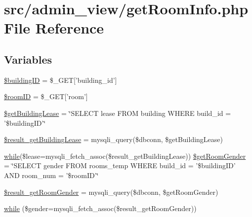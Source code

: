 \hypertarget{getRoomInfo_8php}{\section{src/admin\-\_\-view/get\-Room\-Info.php \-File \-Reference}
\label{getRoomInfo_8php}
}
\subsection*{\-Variables}
\begin{DoxyCompactItemize}
\item 
\hyperlink{getRoomInfo_8php_acfaa0ff73c631ce07c4851ed12fcd83d}{\$building\-I\-D} = \$\-\_\-\-G\-E\-T\mbox{[}'building\-\_\-id'\mbox{]}
\item 
\hyperlink{getRoomInfo_8php_a61034568ba6e795a925d00afa98d3797}{\$room\-I\-D} = \$\-\_\-\-G\-E\-T\mbox{[}'room'\mbox{]}
\item 
\hyperlink{getRoomInfo_8php_aabf2e51b7b4dbb02c653d458b96fcd32}{\$get\-Building\-Lease} = \char`\"{}\-S\-E\-L\-E\-C\-T lease \-F\-R\-O\-M building \-W\-H\-E\-R\-E build\-\_\-id = '\$building\-I\-D'\char`\"{}
\item 
\hyperlink{getRoomInfo_8php_a85b7461a0b78e5b681f1c7c5c6b4654c}{\$result\-\_\-get\-Building\-Lease} = mysqli\-\_\-query(\$dbconn, \$get\-Building\-Lease)
\item 
\hyperlink{studentForm_8php_abeb5d2366a9870820ffb1e260d040d8d}{while}(\$lease=mysqli\-\_\-fetch\-\_\-assoc(\$result\-\_\-get\-Building\-Lease)) \hyperlink{getRoomInfo_8php_a65a823b86bd329b8545e10df6a4bc325}{\$get\-Room\-Gender} = \char`\"{}\-S\-E\-L\-E\-C\-T gender \-F\-R\-O\-M rooms\-\_\-temp \-W\-H\-E\-R\-E build\-\_\-id = '\$building\-I\-D' \-A\-N\-D room\-\_\-num = '\$room\-I\-D'\char`\"{}
\item 
\hyperlink{getRoomInfo_8php_a9ce0616f2a54ee7e19e22d0bb7c4c1c7}{\$result\-\_\-get\-Room\-Gender} = mysqli\-\_\-query(\$dbconn, \$get\-Room\-Gender)
\item 
\hyperlink{getRoomInfo_8php_a47624afeb833a11e7095ab00ea7bd2ea}{while} (\$gender=mysqli\-\_\-fetch\-\_\-assoc(\$result\-\_\-get\-Room\-Gender))
\end{DoxyCompactItemize}


